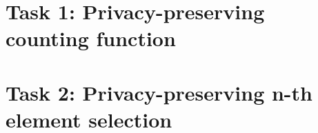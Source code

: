 
\newpage


\section{Task 1: Privacy-preserving counting function}




\section{Task 2: Privacy-preserving n-th element selection}


